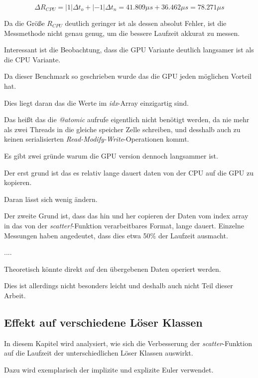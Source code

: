 $$
\Delta R_{CPU} = | 1 | \Delta t_o + |-1| \Delta t_n  = 41.809 \mu s + 36.462 \mu s = 78.271 \mu s
$$


Da die Größe $R_{CPU}$ deutlich geringer ist als dessen absolut Fehler, ist die Messmethode nicht genau genug, um die bessere Laufzeit akkurat zu messen.

Interessant ist die Beobachtung, dass die GPU Variante deutlich langsamer ist als die CPU Variante.

Da dieser Benchmark so geschrieben wurde das die GPU jeden möglichen Vorteil hat.

Dies liegt daran das die Werte im \textit{idx}-Array einzigartig sind.

Das heißt das die \textit{@atomic} aufrufe eigentlich nicht benötigt werden, da nie mehr als zwei Threads in die gleiche speicher Zelle schreiben,
und desshalb auch zu keinen serialisierten \textit{Read-Modify-Write}-Operationen kommt.

Es gibt zwei gründe warum die GPU version dennoch langsammer ist.

Der erst grund ist das es relativ lange dauert daten von der CPU auf die GPU zu kopieren.

Daran lässt sich wenig ändern.

Der zweite Grund ist, dass das hin und her copieren der Daten vom index array in das von der \textit{scatter!}-Funktion verarbeitbares Format, 
lange dauert. Einzelne Messungen haben angedeutet, dass dies etwa 50\% der Laufzeit ausmacht.

....


Theoretisch könnte direkt auf den übergebenen Daten operiert werden.

Dies ist allerdings nicht besonders leicht und deshalb auch nicht Teil dieser Arbeit.



\subsection{Effekt auf verschiedene Löser Klassen}

In diesem Kapitel wird analysiert, wie sich die Verbesserung der \textit{scatter}-Funktion auf die Laufzeit der unterschiedlichen 
Löser Klassen auswirkt.

Dazu wird exemplarisch der implizite und explizite Euler verwendet.

